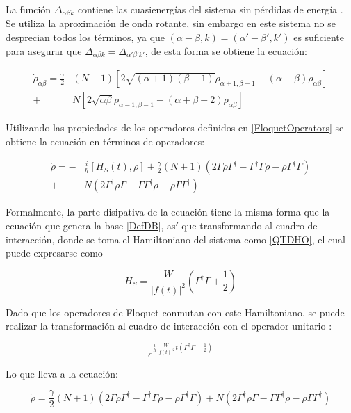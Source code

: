 \documentclass[a4paper,10pt]{report}
\begin{document}
La función $\Delta_{\alpha \beta k}$ contiene las cuasienergías del sistema sin pérdidas de energía \cite{HanngiDQS}. Se utiliza la aproximación de onda rotante, sin embargo en este sistema no se desprecian todos los términos, ya que $(\alpha-\beta,k)=(\alpha'-\beta',k')$ es suficiente para asegurar que $\Delta_{\alpha \beta k}=\Delta_{\alpha' \beta' k'}$, de esta forma se obtiene la ecuación:

\begin{align*}
\dot{\rho}_{\alpha \beta} = \frac{\gamma}{2}&(N+1)[2\sqrt{(\alpha+1)(\beta + 1)}\rho_{\alpha+1,\beta+1} - (\alpha + \beta)\rho_{\alpha \beta}]\\
+& N[2\sqrt{\alpha \beta}\rho_{\alpha-1,\beta-1} - (\alpha + \beta + 2)\rho_{\alpha \beta}]
\end{align*}

Utilizando las propiedades de los operadores definidos en \ref{FloquetOperators} se obtiene la ecuación en términos de operadores:

\begin{align*}
\dot{\rho} = -&\frac{i}{\hbar}[H_S (t),\rho] + \frac{\gamma}{2}(N+1)(2\Gamma\rho\Gamma^\dagger - \Gamma^\dagger\Gamma \rho - \rho \Gamma^\dagger \Gamma )\\
 +& N(2\Gamma^\dagger \rho \Gamma - \Gamma \Gamma^\dagger \rho - \rho \Gamma\Gamma^\dagger)
\end{align*}

Formalmente, la parte disipativa de la ecuación tiene la misma forma que la ecuación que genera la base \ref{DefDB}, así que transformando al cuadro de interacción, donde se toma el Hamiltoniano del sistema como \ref{QTDHO}, el cual puede expresarse como\cite{BrownPT}

\begin{equation}
H_S = \frac{W}{|f(t)|^2}(\Gamma^\dagger \Gamma + \frac{1}{2})
\end{equation}

Dado que los operadores de Floquet conmutan con este Hamiltoniano, se puede realizar la transformación al cuadro de interacción con el operador unitario \cite{SakuraiQM}:

\begin{equation}
 e^{\frac{i}{\hbar}\frac{W}{|f(t)|^2}t(\Gamma^\dagger \Gamma + \frac{1}{2})}
\end{equation}

Lo que lleva a la ecuación:

\begin{equation} \label{GammaLindblat}
\dot{\rho}=\frac{\gamma}{2}(N+1)(2\Gamma\rho\Gamma^\dagger - \Gamma^\dagger\Gamma \rho - \rho \Gamma^\dagger \Gamma )
 + N(2\Gamma^\dagger \rho \Gamma - \Gamma \Gamma^\dagger \rho - \rho \Gamma\Gamma^\dagger)
\end{equation}
\end{document}
